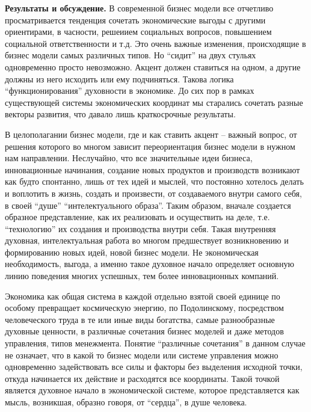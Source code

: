{\bfseries Результаты и обсуждение.} В современной бизнес модели все
отчетливо просматривается тенденция сочетать экономические выгоды с
другими ориентирами, в часности, решеиием социальных вопросов,
повышением социальной ответственности и т.д. Это очень важные изменения,
происходящие в бизнес модели самых различных типов. Но ``сидит'' на двух
стульях одновременно просто невозможно. Акцент должен ставиться на
одном, а другие должны из него исходить или ему подчиняться. Такова
логика ``функционирования'' духовности в экономике. До сих пор в рамках
существующей системы экономических координат мы старались сочетать
разные векторы развития, что давало лишь краткосрочные результаты.

В целополагании бизнес модели, где и как ставить акцент -- важный
вопрос, от решения которого во многом зависит переориентация бизнес
модели в нужном нам направлении. Неслучайно, что все значительные идеи
бизнеса, инновационные начинания, создание новых продуктов и производств
возникают как будто спонтанно, лишь от тех идей и мыслей, что постоянно
хотелось делать и воплотить в жизнь, создать и произвести, от
создаваемого внутри самого себя, в своей ``душе'' ``интелектуального
образа''. Таким образом, вначале создается образное представление, как
их реализовать и осуществить на деле, т.е. ``технологию'' их создания и
производства внутри себя. Такая внутренняя духовная, интелектуальная
работа во многом предшествует возникновению и формированию новых идей,
новой бизнес модели. Не экономическая необходимость, выгода, а именно
такое духовное начало определяет основную линию поведения многих
успешных, тем более инновационных компаний.

Экономика как общая система в каждой отдельно взятой своей единице по
особому превращает космическую энергию, по Подолинскому, посредством
человеческого труда в те или иные виды богатства, самые разнообразные
духовные ценности, в различные сочетания бизнес моделей и даже методов
управления, типов менежмента. Понятие ``различные сочетания'' в данном
случае не означает, что в какой то бизнес модели или системе управления
можно одновременно задействовать все силы и факторы без выделения
исходной точки, откуда начинается их действие и расходятся все
координаты. Такой точкой является духовное начало в экономической
системе, которое представляется как мысль, возникшая, образно говоря, от
``сердца'', в душе человека.

